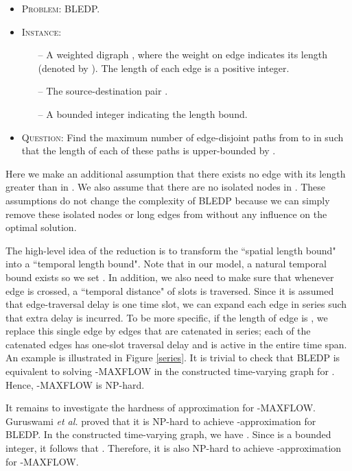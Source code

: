 \documentclass[10pt, conference, letterpaper]{IEEEtran}
\begin{document}
\begin{itemize}

\item \textsc{Problem:} BLEDP.

\item \textsc{Instance:}
\begin{itemize}
\item [--] {A weighted digraph , where the weight on edge  indicates its length (denoted by ). The length of each edge is a positive integer.}
\item [--] {The source-destination pair .}
\item [--] {A bounded integer  indicating the length bound.}
\end{itemize}

\item \textsc{Question:} Find the maximum number of edge-disjoint paths from  to  in  such that the length of each of these paths is upper-bounded by .
\end{itemize}

Here we make an additional assumption that there exists no edge with its length greater than  in . We also assume that there are no isolated nodes in . These assumptions do not change the complexity of BLEDP because we can simply remove these isolated nodes or long edges from  without any influence on the optimal solution.

The high-level idea of the reduction is to transform the ``spatial length bound" into a ``temporal length bound". Note that in our model, a natural temporal bound  exists so we set . In addition, we also need to make sure that whenever  edge  is crossed, a ``temporal distance" of  slots is traversed. Since it is assumed that edge-traversal delay is one time slot, we can expand each edge in series such that extra delay is incurred. To be more specific, if the length of edge  is , we replace this single edge by  edges that are catenated in series; each of the catenated edges has one-slot traversal delay and is active in the entire time span. An example is illustrated in Figure \ref{series}.  It is trivial to check that BLEDP is equivalent to solving -MAXFLOW in the constructed time-varying graph for . Hence, -MAXFLOW is NP-hard.

It remains to investigate the hardness of approximation for -MAXFLOW.  Guruswami \emph{et al.} \cite{hard} proved that it is NP-hard to achieve -approximation for BLEDP. In the constructed time-varying graph, we have . Since  is a bounded integer,  it follows that . Therefore, it is also NP-hard to achieve -approximation for -MAXFLOW.
\end{document}
